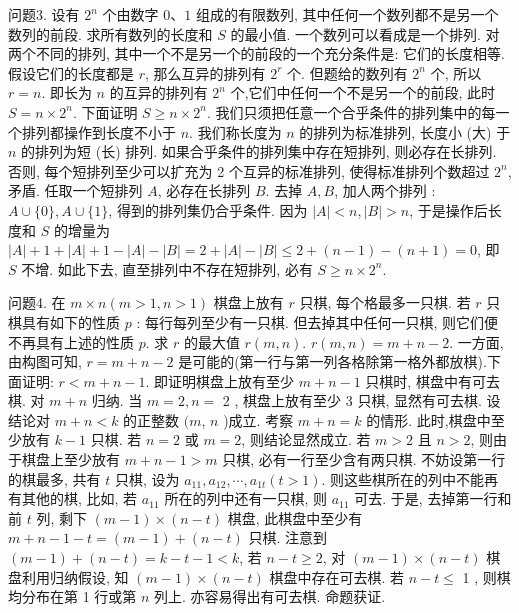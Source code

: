 问题3. 设有 $2^n$ 个由数字 $0 、 1$ 组成的有限数列, 其中任何一个数列都不是另一个数列的前段.
求所有数列的长度和 $S$ 的最小值.
一个数列可以看成是一个排列.
对两个不同的排列, 其中一个不是另一个的前段的一个充分条件是: 它们的长度相等.
假设它们的长度都是 $r$, 那么互异的排列有 $2^r$ 个.
但题给的数列有 $2^n$ 个, 所以 $r=n$. 即长为 $n$ 的互异的排列有 $2^n$ 个,它们中任何一个不是另一个的前段, 此时 $S=n \times 2^n$. 下面证明 $S \geqslant n \times 2^n$. 我们只须把任意一个合乎条件的排列集中的每一个排列都操作到长度不小于 $n$. 我们称长度为 $n$ 的排列为标准排列, 长度小 (大) 于 $n$ 的排列为短 (长) 排列.
如果合乎条件的排列集中存在短排列, 则必存在长排列.
否则, 每个短排列至少可以扩充为 2 个互异的标准排列, 使得标准排列个数超过 $2^n$, 矛盾.
任取一个短排列 $A$, 必存在长排列 $B$. 去掉 $A, B$, 加人两个排列 : $A \cup \{0\}, A \cup\{1\}$, 得到的排列集仍合乎条件.
因为 $|A|<n,|B|>n$, 于是操作后长度和 $S$ 的增量为 $|A|+1+|A|+1-|A|-|B|=2+|A|-|B| \leqslant 2+(n-1)-(n+1)=0$, 即 $S$ 不增.
如此下去, 直至排列中不存在短排列, 必有 $S \geqslant n \times 2^n$.



问题4. 在 $m \times n(m>1, n>1)$ 棋盘上放有 $r$ 只棋, 每个格最多一只棋.
若 $r$ 只棋具有如下的性质 $p$ : 每行每列至少有一只棋.
但去掉其中任何一只棋, 则它们便不再具有上述的性质 $p$. 求 $r$ 的最大值 $r(m, n)$.
$r(m, n)=m+n-2$. 一方面, 由构图可知, $r=m+n-2$ 是可能的(第一行与第一列各格除第一格外都放棋).下面证明: $r<m+n-1$. 即证明棋盘上放有至少 $m+n-1$ 只棋时, 棋盘中有可去棋.
对 $m+n$ 归纳.
当 $m=2, n=$ 2 , 棋盘上放有至少 3 只棋, 显然有可去棋.
设结论对 $m+n<k$ 的正整数 $(m$, $n$ )成立.
考察 $m+n=k$ 的情形.
此时,棋盘中至少放有 $k-1$ 只棋.
若 $n=2$ 或 $m=2$, 则结论显然成立.
若 $m>2$ 且 $n>2$, 则由于棋盘上至少放有 $m+ n-1>m$ 只棋, 必有一行至少含有两只棋.
不妨设第一行的棋最多, 共有 $t$ 只棋, 设为 $a_{11}, a_{12}, \cdots, a_{1 t}(t>1)$. 则这些棋所在的列中不能再有其他的棋, 比如, 若 $a_{11}$ 所在的列中还有一只棋, 则 $a_{11}$ 可去.
于是, 去掉第一行和前 $t$ 列, 剩下 $(m-1) \times(n-t)$ 棋盘, 此棋盘中至少有 $m+n-1-t=(m-1)+(n-t)$ 只棋.
注意到 $(m-1)+(n-t)=k-t-1<k$, 若 $n-t \geqslant 2$, 对 $(m-1) \times (n-t)$ 棋盘利用归纳假设, 知 $(m-1) \times(n-t)$ 棋盘中存在可去棋.
若 $n-t \leqslant$ 1 , 则棋均分布在第 1 行或第 $n$ 列上.
亦容易得出有可去棋.
命题获证.



